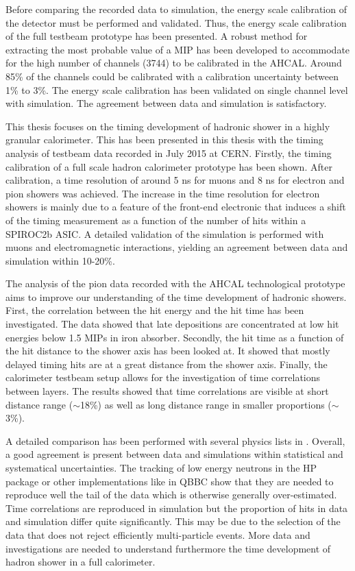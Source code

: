 Before comparing the recorded data to simulation, the energy scale calibration of the detector must be performed and validated. Thus, the energy scale calibration of the full testbeam prototype has been presented. A robust method for extracting the most probable value of a MIP has been developed to accommodate for the high number of channels (3744) to be calibrated in the AHCAL. Around 85\% of the channels could be calibrated with a calibration uncertainty between 1\% to 3\%. The energy scale calibration has been validated on single channel level with simulation. The agreement between data and simulation is satisfactory.

This thesis focuses on the timing development of hadronic shower in a highly granular calorimeter. This has been presented in this thesis with the timing analysis of testbeam data recorded in July 2015 at CERN. Firstly, the timing calibration of a full scale hadron calorimeter prototype has been shown. After calibration, a time resolution of around 5 ns for muons and 8 ns for electron and pion showers was achieved. The increase in the time resolution for electron showers is mainly due to a feature of the front-end electronic that induces a shift of the timing measurement as a function of the number of hits within a SPIROC2b ASIC.
A detailed validation of the simulation is performed with muons and electromagnetic interactions, yielding an agreement between data and simulation within 10-20\%.

The analysis of the pion data recorded with the AHCAL technological prototype aims to improve our understanding of the time development of hadronic showers. First, the correlation between the hit energy and the hit time has been investigated. The data showed that late depositions are concentrated at low hit energies below 1.5 MIPs in iron absorber. Secondly, the hit time as a function of the hit distance to the shower axis has been looked at. It showed that mostly delayed timing hits are at a great distance from the shower axis. Finally, the calorimeter testbeam setup allows for the investigation of time correlations between layers. The results showed that time correlations are visible at short distance range ($\sim$18\%) as well as long distance range in smaller proportions ($\sim$3\%).

A detailed comparison has been performed with several physics lists in \geant. Overall, a good agreement is present between data and simulations within statistical and systematical uncertainties. The tracking of low energy neutrons in the HP package or other implementations like in QBBC show that they are needed to reproduce well the tail of the data which is otherwise generally over-estimated. Time correlations are reproduced in simulation but the proportion of hits in data and simulation differ quite significantly. This may be due to the selection of the data that does not reject efficiently multi-particle events. More data and investigations are needed to understand furthermore the time development of hadron shower in a full calorimeter.

